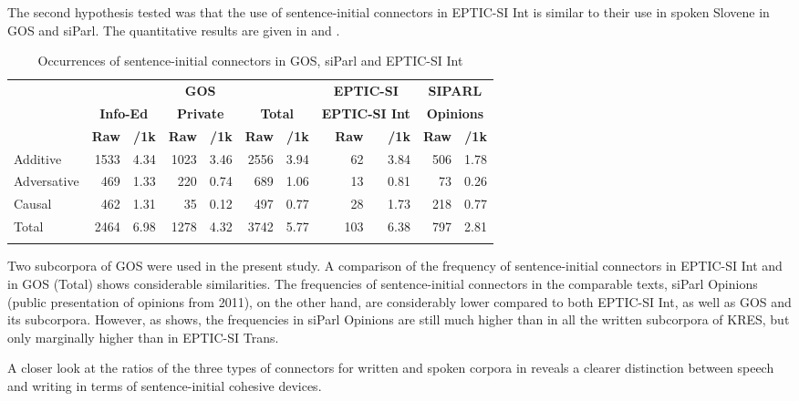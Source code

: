 \documentclass[output=paper]{langscibook}
\begin{document}
The second hypothesis tested was that the use of sentence-initial connectors in EPTIC-SI Int is similar to their use in spoken Slovene in GOS and siParl. The quantitative results are given in  and .

\begin{table}
\small
\begin{tabularx}{\textwidth}{Xrrrrrrrrrr}

\lsptoprule

 & \multicolumn{6}{c}{{\bfseries GOS}} & \multicolumn{2}{c}{{\bfseries EPTIC-SI} } & \multicolumn{2}{c}{{\bfseries SIPARL}}\\
 & \multicolumn{2}{c}{{\bfseries Info-Ed}} & \multicolumn{2}{c}{{\bfseries Private}} & \multicolumn{2}{c}{{\bfseries Total} } & \multicolumn{2}{c}{{\bfseries EPTIC-SI Int}} & \multicolumn{2}{c}{{\bfseries Opinions}}\\
 & {\bfseries Raw} & {\bfseries /1k} & {\bfseries Raw} & {\bfseries /1k} & {\bfseries Raw} & {\bfseries /1k} & {\bfseries Raw} & {\bfseries /1k} & {\bfseries Raw} & {\bfseries /1k}\\
\midrule
Additive & 1533 & 4.34 & 1023 & 3.46 & 2556 & 3.94 & 62 & 3.84 & 506 & 1.78\\
Adversative & 469 & 1.33 & 220 & 0.74 & 689 & 1.06 & 13 & 0.81 & 73 & 0.26\\
Causal & 462 & 1.31 & 35 & 0.12 & 497 & 0.77 & 28 & 1.73 & 218 & 0.77\\
\midrule
Total & 2464 & 6.98 & 1278 & 4.32 & 3742 & 5.77 & 103 & 6.38 & 797 & 2.81\\
\lspbottomrule
\end{tabularx}
\caption{Occurrences of sentence-initial connectors in GOS, siParl and EPTIC-SI Int}
\label{tab:mikolic:5}
\end{table}

Two subcorpora of GOS were used in the present study. A comparison of the frequency of sentence-initial connectors in EPTIC-SI Int and in GOS (Total) shows considerable similarities. The frequencies of sentence-initial connectors in the comparable texts, siParl Opinions (public presentation of opinions from 2011), on the other hand, are considerably lower compared to both EPTIC-SI Int, as well as GOS and its subcorpora. However, as  shows, the frequencies in siParl Opinions are still much higher than in all the written subcorpora of KRES, but only marginally higher than in EPTIC-SI Trans.

A closer look at the ratios of the three types of connectors for written and spoken corpora in  reveals a clearer distinction between speech and writing in terms of sentence-initial cohesive devices.
\end{document}

